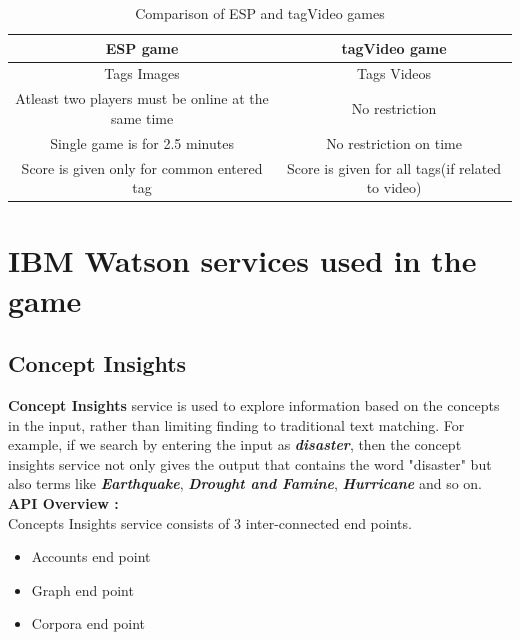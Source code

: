 \documentclass[12pt]{article}
\begin{document}
 \begin{table}[htb]
	\begin{center}
	 
 
\begin{tabular}{||c||c||} 

\hline
 \textbf{ESP game} & \textbf{tagVideo game} \\ [0.5ex] 
 \hline\hline
 Tags Images & Tags Videos \\ 
 \hline
 
 Atleast two players must be online at the same time & No restriction  \\
 \hline
 
  Single game is for 2.5 minutes & No restriction on time  \\
 \hline
 
   Score is given only for common entered tag & Score is given for all tags(if related to video)  \\
 \hline
 
 \end{tabular}
 \caption{Comparison of ESP and tagVideo games}
 \end{center}
 
\end{table}





\newpage
\section{IBM Watson services used in the game}
\subsection{Concept Insights\cite{conceptinsights}}
\textbf{Concept Insights} service is used to explore information based on the concepts in the input, rather than limiting finding to traditional text matching. For example, if we search by entering the input as \textbf{\textit{disaster}}, then the concept insights service not only gives the output that contains the word "disaster" but also terms like \textbf{\textit{Earthquake}}, \textbf{\textit{Drought and Famine}}, \textbf{\textit{Hurricane}} and so on.\\


\textbf{API Overview :}\\
Concepts Insights service consists of 3 inter-connected end points.
\begin{itemize}
\item Accounts end point
\item Graph end point
\item Corpora end point
\end{itemize} 
\end{document}
